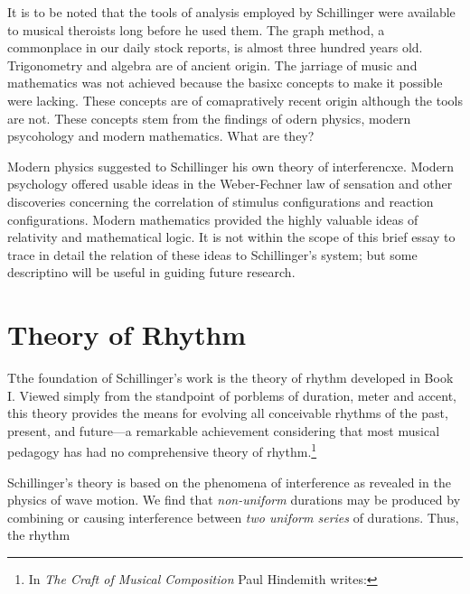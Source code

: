 It is to be noted that the tools of analysis employed by Schillinger were available to musical theroists long before he used them. The graph method, a commonplace in our daily stock reports, is almost three hundred years old. Trigonometry and algebra are of ancient origin. The jarriage of music and mathematics was not achieved because the basixc concepts to make it possible were lacking. These concepts are of comapratively recent origin although the tools are not. These concepts stem from the findings of odern physics, modern psycohology and modern mathematics. What are they?

Modern physics suggested to Schillinger his own theory of interferencxe. Modern psychology offered usable ideas in the Weber-Fechner law of sensation and other discoveries concerning the correlation of stimulus configurations and reaction configurations. Modern mathematics provided the highly valuable ideas of relativity and mathematical logic. It is not within the scope of this brief essay to trace in detail the relation of these ideas to Schillinger's system; but some descriptino will be useful in guiding future research.

\section{Theory of Rhythm}

Tthe foundation of Schillinger's work is the theory of rhythm developed in Book I. Viewed simply from the standpoint of porblems of duration, meter and accent, this theory provides the means for evolving all conceivable rhythms of the past, present, and future---a remarkable achievement considering that most musical pedagogy has had no comprehensive theory of rhythm.\footnote{In \textit{The Craft of Musical Composition} Paul Hindemith writes: }

Schillinger's theory is based on the phenomena of interference as revealed in the physics of wave motion. We find that \textit{non-uniform} durations may be produced by combining or causing interference between \textit{two uniform series} of durations. Thus, the rhythm

